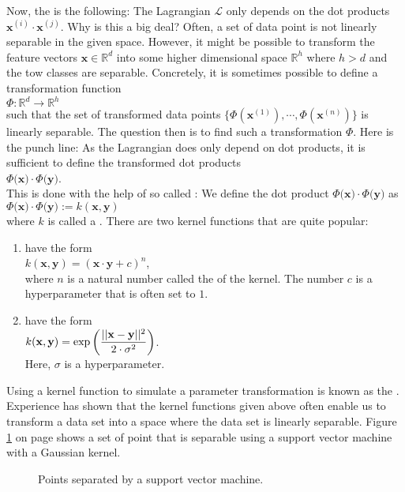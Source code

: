 Now, the  is the following:  The Lagrangian $\mathcal{L}$ only depends on the dot
products $\mathbf{x}^{(i)} \cdot \mathbf{x}^{(j)}$.  Why is this a big deal?  Often, a set of data point is not
linearly separable in the given space.  However, it might be possible to transform the feature vectors
$\mathbf{x} \in \mathbb{R}^d$ into some higher dimensional space $\mathbb{R}^h$ where $h > d$ and the tow
classes are separable.  Concretely, it is sometimes possible to define a transformation function
\\[0.2cm]
\hspace*{1.3cm}
$\Phi: \mathbb{R}^d \rightarrow \mathbb{R}^h$
\\[0.2cm]
such that the set of transformed data points
$\bigl\{\Phi(\mathbf{x}^{(1)}), \cdots, \Phi(\mathbf{x}^{(n)})\bigr\}$ is linearly separable.
The question then is to find such a transformation $\Phi$.  Here is the punch line:  As the Lagrangian does
only depend on dot products, it is sufficient to define the transformed dot products
\\[0.2cm]
\hspace*{1.3cm}
$\Phi\bigl(\mathbf{x}\bigr) \cdot \Phi\bigl(\mathbf{y}\bigr) $.
\\[0.2cm]
This is done with the help of so called :  We define the dot product
$\Phi\bigl(\mathbf{x}\bigr) \cdot \Phi\bigl(\mathbf{y}\bigr)$ as
\\[0.2cm]
\hspace*{1.3cm}
$\Phi\bigl(\mathbf{x}\bigr) \cdot \Phi\bigl(\mathbf{y}\bigr) := k(\mathbf{x}, \mathbf{y})$
\\[0.2cm]
where $k$ is called a .  There are two kernel functions that are quite popular:
\begin{enumerate}
\item {} have the form
      \\[0.2cm]
      \hspace*{1.3cm}
      $k(\mathbf{x}, \mathbf{y}) = (\mathbf{x} \cdot \mathbf{y} + c)^n$,
      \\[0.2cm]
      where $n$ is a natural number called the  of the kernel.
      The number $c$ is a hyperparameter that is often set to $1$.
\item {} have the form
      \\[0.2cm]
      \hspace*{1.3cm}
      $\displaystyle k(\mathbf{x}, \mathbf{y}) = \exp\left( \frac{||\mathbf{x}-\mathbf{y}||^2}{2 \cdot \sigma^2}\right)$.
      \\[0.2cm]
      Here, $\sigma$ is a hyperparameter.  
\end{enumerate}
Using a kernel function to simulate a parameter transformation is known as the .    
Experience has shown that the kernel functions given above often enable us to transform a data set into a space where the
data set is linearly separable.  Figure \ref{fig:strange-data.pdf} on page \pageref{fig:strange-data.pdf} shows
a set of point that is separable using a support vector machine with a Gaussian kernel.

\begin{figure}[!th]
\caption{Points separated by a support vector machine.}
\label{fig:strange-data.pdf}
\end{figure}

 
